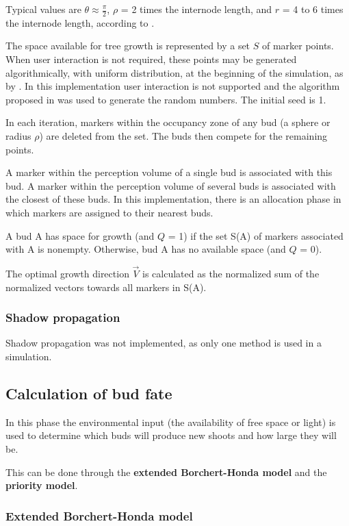 \documentclass{article}
\begin{document}
Typical values are \(\theta \approx \frac{\pi}{2}\), \(\rho\) = 2 times the internode length, and \(r\) = 4 to 6 times the internode length, according to \cite[p. 3]{Palubicki2009}.

The space available for tree growth is represented by a set \(S\) of marker points.
When user interaction is not required, these points may be generated algorithmically, with uniform distribution, at the beginning of the simulation, as by \cite[p. 3]{Palubicki2009}.
In this implementation user interaction is not supported and the algorithm proposed in \cite{Steele2014} was used to generate the random numbers. The initial seed is 1.

In each iteration, markers within the occupancy zone of any bud (a sphere or radius \(\rho\)) are deleted from the set.
The buds then compete for the remaining points.

A marker within the perception volume of a single bud is associated with this bud. A marker within the perception volume of several buds is associated with the closest of these buds.
In this implementation, there is an allocation phase in which markers are assigned to their nearest buds.

A bud A has space for growth (and \(Q\) = 1) if the set S(A) of markers associated with A is nonempty. Otherwise, bud A has no available space (and \(Q\) = 0).

The optimal growth direction \(\vec{V}\) is calculated as the normalized sum of the normalized vectors towards all markers in S(A).

\subsubsection{Shadow propagation}

Shadow propagation was not implemented, as only one method is used in a simulation.

\subsection{Calculation of bud fate}

In this phase the environmental input (the availability of free space or light) is used to determine which buds will produce new shoots and how large they will be.

This can be done through the \textbf{extended Borchert-Honda model}  and the \textbf{priority model}.

\subsubsection{Extended Borchert-Honda model}
\end{document}
